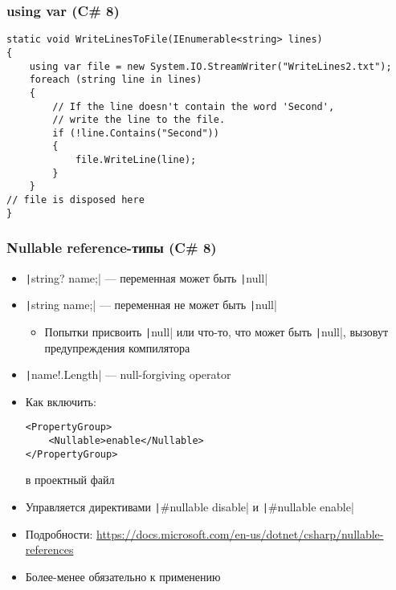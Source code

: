 \documentclass[xetex,mathserif,serif]{beamer}
\begin{document}
	\begin{frame}[fragile]
		\frametitle{using var (C\# 8)}
		\begin{verbatim}
static void WriteLinesToFile(IEnumerable<string> lines)
{
    using var file = new System.IO.StreamWriter("WriteLines2.txt");
    foreach (string line in lines)
    {
        // If the line doesn't contain the word 'Second', 
        // write the line to the file.
        if (!line.Contains("Second"))
        {
            file.WriteLine(line);
        }
    }
// file is disposed here
}
		\end{verbatim}
	\end{frame}

		\begin{frame}[fragile]
		\frametitle{Nullable reference-типы (C\# 8)}
		\begin{itemize}
			\item \texttt|string? name;| --- переменная может быть \texttt|null|
			\item \texttt|string name;| --- переменная не может быть \texttt|null|
			\begin{itemize}
				\item Попытки присвоить \texttt|null| или что-то, что может быть \texttt|null|, вызовут предупреждения компилятора
			\end{itemize}
			\item \texttt|name!.Length| --- null-forgiving operator
			\item Как включить: 
				\begin{verbatim}
<PropertyGroup>
    <Nullable>enable</Nullable>
</PropertyGroup>
				\end{verbatim}
				в проектный файл
			\item Управляется директивами \texttt|#nullable disable| и \texttt|#nullable enable|
			\item Подробности: \url{https://docs.microsoft.com/en-us/dotnet/csharp/nullable-references}
			\item Более-менее обязательно к применению
		\end{itemize}
	\end{frame}
\end{document}
